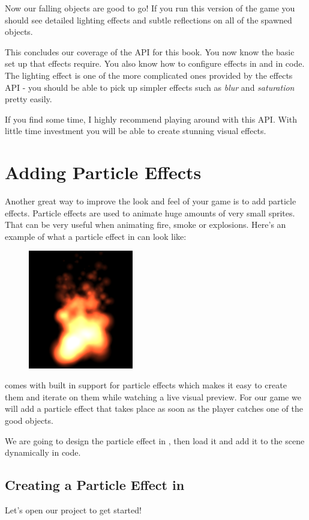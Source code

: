 Now our falling objects are good to go! If you run this version of the game you
should see detailed lighting effects and subtle reflections on all of the
spawned objects.

This concludes our coverage of the  API for this book. You
now know the basic set up that effects require. You also know how to configure
effects in \SB{} and in code. The lighting effect is one of the more complicated
ones provided by the effects API - you should be able to pick up simpler effects
such as \textit{blur} and \textit{saturation} pretty easily.

If you find some time, I highly recommend playing around with this API. With
little time investment you will be able to create stunning visual effects.

\section{Adding Particle Effects}
Another great way to improve the look and feel of your game is to add particle
effects. Particle effects are used to animate huge amounts of very small
sprites. That can be very useful when animating fire, smoke or explosions.
Here's an example of what a particle effect in \cocos{} can look like:

\begin{figure}[H]
  \centering
  \includegraphics[width=130pt]{images/Chapter9/particle_fire.png}
\end{figure}

\SB{} comes with built in support for particle effects which makes it easy to
create them and iterate on them while watching a live visual preview. 
For our game we will add a particle effect that takes place as soon as the
player catches one of the good objects.

We are going to design the particle effect in \SB{}, then load it and add it to
the scene dynamically in code.

\subsection{Creating a Particle Effect in \SB{}}
Let's open our \SB{} project to get started!

